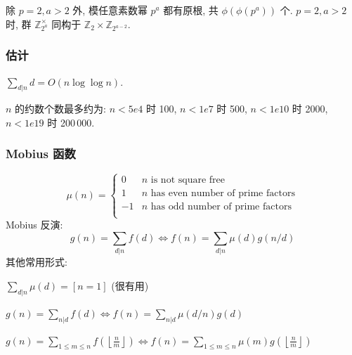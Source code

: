 	除 $p = 2, a > 2$ 外, 模任意素数幂 $p^a$ 都有原根, 共 $\phi(\phi(p^a))$ 个.
	$p = 2, a > 2$ 时, 群 $\mathbb Z_{2^a}^\times$ 同构于 $\mathbb Z_2 \times \mathbb Z_{2^{a-2}}$.

\subsubsection{估计}
	$\sum_{d|n} d = O(n \log \log n)$.

	$n$ 的约数个数最多约为: $n < 5e4$ 时 100, $n < 1e7$ 时 500, $n < 1e10$ 时 2000, $n < 1e19$ 时 200\,000.

\subsubsection{Mobius 函数}
\[
	\mu(n) = \begin{cases} 0 & n \textrm{ is not square free}\\ 1 & n \textrm{ has even number of prime factors}\\ -1 & n \textrm{ has odd number of prime factors}\\\end{cases}
\]
  Mobius 反演:
  \[ g(n) = \sum_{d|n} f(d) \Leftrightarrow f(n) = \sum_{d|n} \mu(d)g(n/d) \]
  其他常用形式:

  $ \sum_{d | n} \mu(d) = [ n = 1] $ (很有用)

  $ g(n) = \sum_{n|d} f(d) \Leftrightarrow f(n) = \sum_{n|d} \mu(d/n)g(d)$

 $ g(n) = \sum_{1 \leq m \leq n} f(\left\lfloor\frac{n}{m}\right \rfloor ) \Leftrightarrow f(n) = \sum_{1\leq m\leq n} \mu(m)g(\left\lfloor\frac{n}{m}\right\rfloor)$
